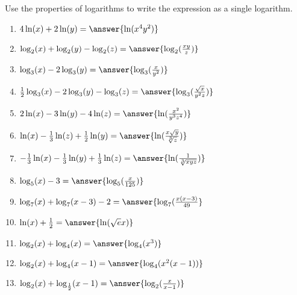 \documentclass{ximera}
\author{Carl Stitz \and Jeff Zeager \and Bart Snapp \and Matthew Carr}
\begin{document}
\begin{exercise}






Use the properties of logarithms to write the expression as a single
logarithm. 

\begin{enumerate}
\item $4\ln(x) + 2\ln(y)\\=\answer{\ln(x^4y^2)}$ \label{combinelogfirst}
\item $\log_{2}(x) + \log_{2}(y) - \log_{2}(z)\\=\answer{\log_{2}(\frac{xy}{z})}$
\item $\log_{3}(x) - 2 \log_{3}(y)\\=\answer{\log_{3}(\frac{x}{y^2})}$
\item $\frac{1}{2}\log_{3}(x) - 2\log_{3}(y) - \log_{3}(z)\\=\answer{\log_{3}(\frac{\sqrt{x}}{y^2 z})}$
\item $2 \ln(x) -3 \ln(y) - 4\ln(z)\\=\answer{\ln(\frac{x^2}{y^3z^4})}$
\item $\ln(x) - \frac{1}{3} \ln(z) + \frac{1}{2} \ln(y)\\=\answer{\ln(\frac{x\sqrt{y}}{\sqrt[3]{z}})}$
\item $-\frac{1}{3} \ln(x) - \frac{1}{3}\ln(y) + \frac{1}{3} \ln(z)\\=\answer{\ln(\frac{1}{\sqrt[3]{xyz}})}$
\item $\log_{5}(x) - 3\\=\answer{\log_{5}(\frac{x}{125})}$
\item $\log_{7}(x) + \log_{7}(x - 3) - 2\\=\answer{\log_{7}(\frac{x(x-3)}{49}}$
\item $\ln(x) + \frac{1}{2}\\=\answer{\ln(\sqrt{e}x)}$ 
\item $\log_{2}(x) + \log_{4}(x)\\=\answer{\log_{4}(x^{3})}$ 
\item $\log_{2}(x) + \log_{4}(x-1)\\=\answer{\log_{4}(x^2(x-1))}$
\item $\log_{2}(x) + \log_{\frac{1}{2}}(x - 1)\\=\answer{\log_{2}(\frac{x}{x-1})}$ \label{combineloglast}
\end{enumerate}

\end{exercise}
\end{document}
